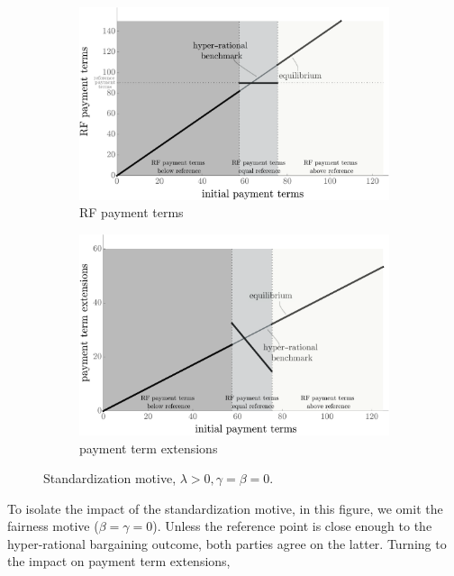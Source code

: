 \documentclass[a4paper,11pt]{article}
\renewcommand{\~}[1]{\tilde{#1}}
\renewcommand{\-}[1]{\overline{#1}}
\begin{document}
\begin{figure}[ht]
     \centering
     \begin{subfigure}[b]{0.47\textwidth}
         \centering
         \includegraphics[width=\textwidth]{figures/10_PosteriorTermsStandard.pdf}
         \caption{RF payment terms \vspace{12pt}}
         \label{fig:standardization:dr}
     \end{subfigure}%
     \hfill%
     \begin{subfigure}[b]{0.47\textwidth}
         \centering
         \includegraphics[width=\textwidth]{figures/10_ExtensionStandard.pdf}
         \caption{payment term extensions\vspace{12pt}}
         \label{fig:standardization:ext}
     \end{subfigure}
        \caption{Standardization motive, $\lambda>0, \gamma=\beta=0$.}
        \label{fig:standardization}
\end{figure}
To isolate the impact of the standardization motive, in this figure, we omit the fairness motive ($\beta=\gamma=0$). Unless the reference point is close enough to the hyper-rational bargaining outcome, both parties agree on the latter. Turning to the impact on payment term extensions,
\end{document}

